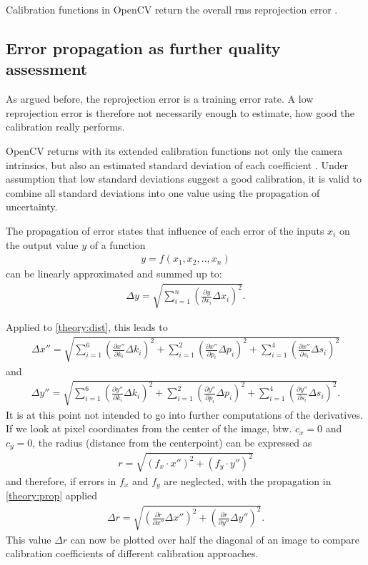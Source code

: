 Calibration functions in OpenCV return the overall \acs{rms} reprojection error \cite{cv_calib}.

\subsection{Error propagation as further quality assessment}
As argued before, the reprojection error is a training error rate.
A low reprojection error is therefore not necessarily enough to estimate, how good the calibration really performs.

OpenCV returns with its extended calibration functions not only the camera intrinsics, but also an estimated standard deviation of each coefficient \cite{cv_calib}.
Under assumption that low standard deviations suggest a good calibration, it is valid to combine all standard deviations into one value using the propagation of uncertainty.

The propagation of error states that influence of each error of the inputs $x_i$ on the output value $y$ of a function
\begin{align*}
	y = f(x_1, x_2,..,x_n)
\end{align*}
can be linearly approximated and summed up to:
\begin{align}
	\Delta y = \sqrt{\sum_{i=1}^{n}\left(\frac{\partial y}{\partial x_i}\Delta x_i \right)^2} \label{theory:prop}.
\end{align}

Applied to \ref{theory:dist}, this leads to
\begin{align*}
	\Delta x''=\sqrt{\sum_{i=1}^{6}\left(\frac{\partial x''}{\partial k_i}\Delta k_i \right)^2+\sum_{i=1}^{2}\left( \frac{\partial x''}{\partial p_i}\Delta p_i\right)^2+\sum_{i=1}^{4}\left( \frac{\partial x''}{\partial s_i}\Delta s_i\right)^2}
\end{align*}
and
\begin{align*}
	\Delta y''=\sqrt{\sum_{i=1}^{6}\left(\frac{\partial y''}{\partial k_i}\Delta k_i \right)^2+\sum_{i=1}^{2}\left( \frac{\partial y''}{\partial p_i}\Delta p_i\right)^2+\sum_{i=1}^{4}\left( \frac{\partial y''}{\partial s_i}\Delta s_i\right)^2}.
\end{align*}
It is at this point not intended to go into further computations of the derivatives.
If we look at pixel coordinates from the center of the image, btw. $c_x=0$ and $c_y=0$, the radius (distance from the centerpoint) can be expressed as
\begin{align*}
	r = \sqrt{(f_x\cdot x'')^2+(f_y\cdot y'')^2}
\end{align*}
and therefore, if errors in $f_x$ and $f_y$ are neglected, with the propagation in \ref{theory:prop} applied
\begin{align}
	\Delta r = \sqrt{\left(\frac{\partial r}{\partial x''} \Delta x''\right)^2+\left(\frac{\partial r}{\partial y''} \Delta y''\right)^2}\label{theory:delta_r}.
\end{align}
This value $\Delta r$ can now be plotted over half the diagonal of an image to compare calibration coefficients of different calibration approaches.





